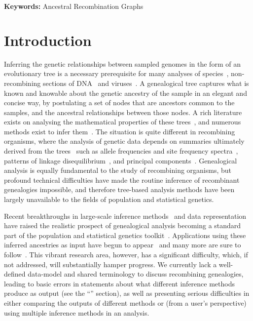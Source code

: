 \documentclass{article}
\begin{document}
\textbf{Keywords:} Ancestral Recombination Graphs

\section*{Introduction}
Inferring the genetic relationships between sampled genomes in the form of an
evolutionary tree is a necessary prerequisite for many analyses of
species~\citep{rannala2003genetics}, non-recombining sections of
DNA~\citep{cann1987mitochondrial,underhill2001annalsofhumangenetics}
and viruses~\citep{grenfell2004science}.
A genealogical tree captures what is known and
knowable about the genetic ancestry of the sample in an elegant and concise
way, by postulating a set of nodes that are ancestors common to the samples,
and the ancestral relationships between those nodes. A rich literature exists
on analysing the mathematical properties of these
trees~\citep{steel2016phylogeny}, and numerous
methods exist to infer them~\citep{felsenstein2004inferring}. The situation is
quite different in recombining organisms, where the analysis of genetic data
depends on summaries ultimately derived from the
trees~\citep{tajima1983evolutionary,tavare1984line}
such as allele frequencies and site frequency
spectra~\citep{achaz2009frequency,ralph2020efficiently},
patterns of linkage disequilibrium~\citep{mcvean2002genealogical}, and principal
components~\citep{mcvean2009genealogical}. Genealogical analysis is equally
fundamental to the study of recombining organisms, but profound technical
difficulties have made the routine inference of recombinant genealogies
impossible, and therefore tree-based analysis methods have been largely
unavailable to the fields of population and statistical
genetics.

Recent breakthroughs in large-scale inference
methods~\citep{rasmussen2014genome,kelleher2019inferring,speidel2019method,wohns2022unified}
and data representation~\citep{kelleher2016efficient}
have raised the realistic prospect of genealogical analysis becoming a standard part
of the population and statistical genetics toolkit~\citep{hejase2020summary}.
Applications using these inferred ancestries as input have
begun to
appear~\citep{osmond2021estimating,zhang2021biobank,fan2022genealogical}
and many more are sure to
follow~\citep{harris2019database}. This vibrant research area, however,
has a significant difficulty, which, if not addressed, will substantially hamper
progress. We currently lack a well-defined data-model and shared terminology
to discuss recombining genealogies, leading to basic errors in statements
about what different inference methods produce as output (see the
``'' section), as well as presenting serious
difficulties in either comparing the outputs of different methods or
(from a user's perspective) using multiple inference methods in an analysis.
\end{document}

